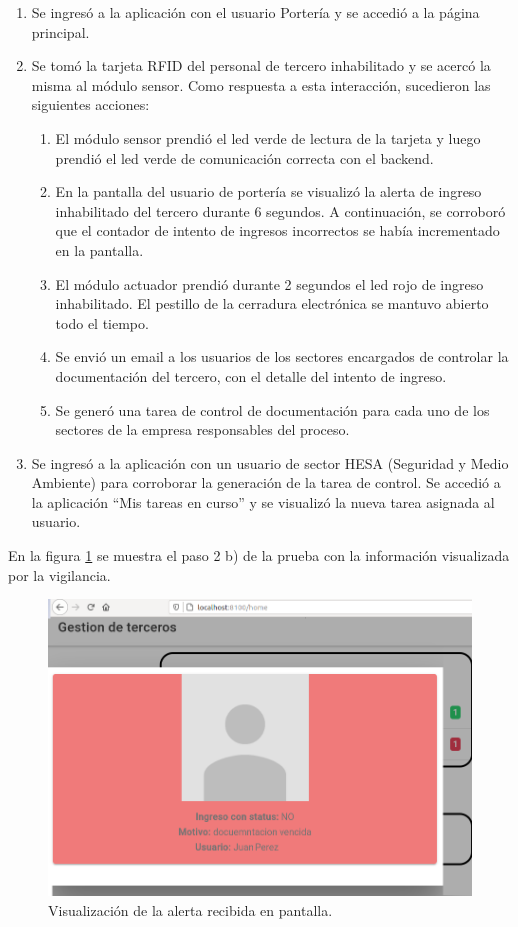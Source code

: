 \begin{enumerate}
\item Se ingresó a la aplicación con el usuario Portería y se accedió a la página principal.
\item Se tomó la tarjeta RFID del personal de tercero inhabilitado y se acercó la misma al módulo sensor. Como respuesta a esta interacción, sucedieron las siguientes acciones:

	\begin{enumerate}
	\item El módulo sensor prendió el led verde de lectura de la tarjeta y luego prendió el led verde de comunicación correcta con el backend.
	\item En la pantalla del usuario de portería se visualizó la alerta de ingreso inhabilitado del tercero durante 6 segundos. A continuación, se corroboró que el contador de intento de ingresos incorrectos se había incrementado en la pantalla.
	\item El módulo actuador prendió durante 2 segundos el led rojo de ingreso inhabilitado. El pestillo de la cerradura electrónica se mantuvo abierto todo el tiempo.
	\item Se envió un email a los usuarios de los sectores encargados de controlar la documentación del tercero, con el detalle del intento de ingreso.
	\item Se generó una tarea de control de documentación para cada uno de los sectores de la empresa responsables del proceso.
	\end{enumerate}

\item Se ingresó a la aplicación con un usuario de sector HESA (Seguridad y Medio Ambiente) para corroborar la generación de la tarea de control. Se accedió a la aplicación ``Mis tareas en curso'' y se visualizó la nueva tarea asignada al usuario.
\end{enumerate}

En la figura \ref{fig:ingresNOOK} se muestra el paso 2 b) de la prueba con la información visualizada por la vigilancia.

\begin{figure}[ht]
	\centering
	\includegraphics[width=1\textwidth]{./Figures/ingresoNOOK.png}
	\caption{Visualización de la alerta recibida en pantalla.}
	\label{fig:ingresNOOK}
\end{figure}

